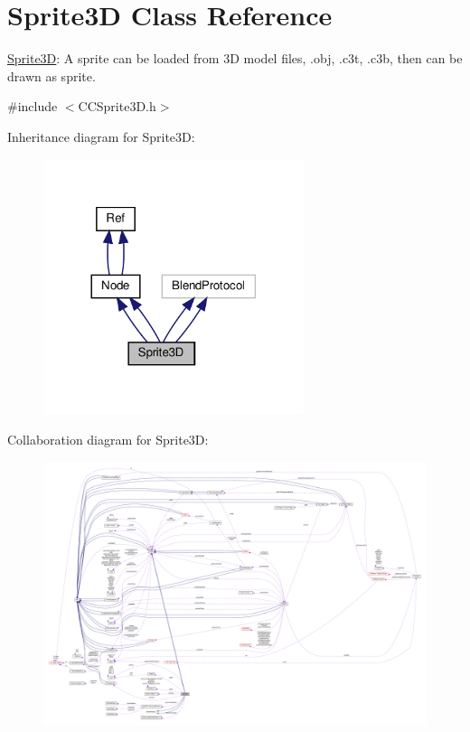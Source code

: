 \hypertarget{classSprite3D}{}\section{Sprite3D Class Reference}
\label{classSprite3D}


\hyperlink{classSprite3D}{Sprite3D}\+: A sprite can be loaded from 3D model files, .obj, .c3t, .c3b, then can be drawn as sprite.  




{\ttfamily \#include $<$C\+C\+Sprite3\+D.\+h$>$}



Inheritance diagram for Sprite3D\+:
\nopagebreak
\begin{figure}[H]
\begin{center}
\leavevmode
\includegraphics[width=216pt]{classSprite3D__inherit__graph}
\end{center}
\end{figure}


Collaboration diagram for Sprite3D\+:
\nopagebreak
\begin{figure}[H]
\begin{center}
\leavevmode
\includegraphics[width=350pt]{classSprite3D__coll__graph}
\end{center}
\end{figure}
